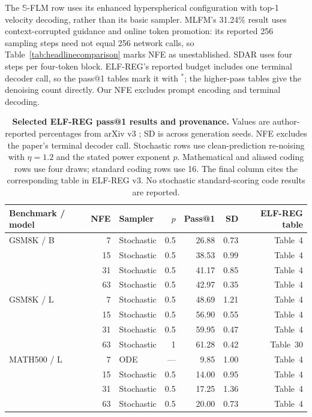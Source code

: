 \documentclass[11pt,letterpaper]{article}
\begin{document}
The $\mathbb S$-FLM row uses its enhanced hyperspherical configuration with top-1 velocity decoding, rather than its basic sampler. MLFM's 31.24\% result uses context-corrupted guidance and online token promotion: its reported 256 sampling steps need not equal 256 network calls, so Table~\ref{tab:headlinecomparison} marks NFE as unestablished. SDAR uses four steps per four-token block. ELF-REG's reported budget includes one terminal decoder call, so the pass@1 tables mark it with $^{*}$; the higher-pass tables give the denoising count directly. Our NFE excludes prompt encoding and terminal decoding.


\begin{table}[!htbp]
\centering\small
\setlength{\tabcolsep}{5pt}
\caption{\textbf{Selected ELF-REG pass@1 results and provenance.} Values are author-reported percentages from arXiv v3 \citep{scalingdlm}; SD is across generation seeds. NFE excludes the paper's terminal decoder call. Stochastic rows use clean-prediction re-noising with $\eta=1.2$ and the stated power exponent $p$. Mathematical and aliased coding rows use four draws; standard coding rows use 16. The final column cites the corresponding table in ELF-REG v3. No stochastic standard-scoring code results are reported.}
\label{tab:elfregselected}
\begin{tabular}{@{}lrlrrrr@{}}
\toprule
Benchmark / model & NFE & Sampler & $p$ & Pass@1 & SD & ELF-REG table\\
\midrule
GSM8K / B & 7 & Stochastic & 0.5 & 26.88 & 0.73 & Table~4\\
 & 15 & Stochastic & 0.5 & 38.53 & 0.99 & Table~4\\
 & 31 & Stochastic & 0.5 & 41.17 & 0.85 & Table~4\\
 & 63 & Stochastic & 0.5 & 42.97 & 0.35 & Table~4\\
\addlinespace
GSM8K / L & 7 & Stochastic & 0.5 & 48.69 & 1.21 & Table~4\\
 & 15 & Stochastic & 0.5 & 56.90 & 0.55 & Table~4\\
 & 31 & Stochastic & 0.5 & 59.95 & 0.47 & Table~4\\
 & 63 & Stochastic & 1 & 61.28 & 0.42 & Table~30\\
\addlinespace
MATH500 / L & 7 & ODE & --- & 9.85 & 1.00 & Table~4\\
 & 15 & Stochastic & 0.5 & 14.00 & 0.95 & Table~4\\
 & 31 & Stochastic & 0.5 & 17.25 & 1.36 & Table~4\\
 & 63 & Stochastic & 0.5 & 20.00 & 0.73 & Table~4\\

\end{tabular}
\end{table}
\end{document}
